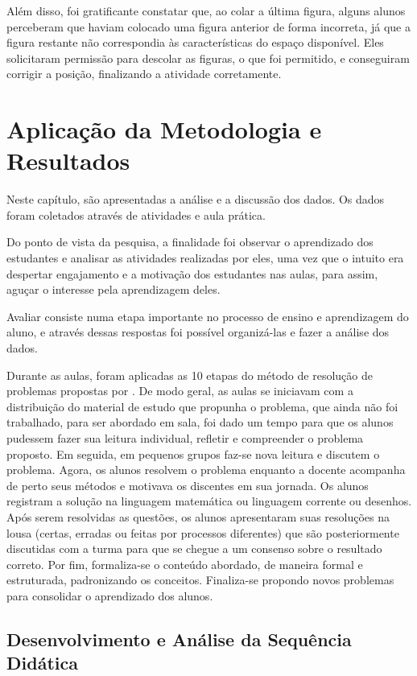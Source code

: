 Além disso, foi gratificante constatar que, ao colar a última figura, alguns alunos perceberam que haviam colocado uma figura anterior de forma incorreta, já que a figura restante não correspondia às características do espaço disponível. Eles solicitaram permissão para descolar as figuras, o que foi permitido, e conseguiram corrigir a posição, finalizando a atividade corretamente.

\chapter{Aplicação da Metodologia e Resultados} \label{cap:4_aplicacao}

Neste capítulo, são apresentadas a análise e a discussão dos dados. Os dados foram coletados através de atividades e aula prática.

Do ponto de vista da pesquisa, a finalidade foi observar o aprendizado dos estudantes e analisar as atividades realizadas por eles, uma vez que o intuito era despertar engajamento e a motivação dos estudantes nas aulas, para assim, aguçar o interesse pela aprendizagem deles.

Avaliar consiste numa etapa importante no processo de ensino e aprendizagem do aluno, e através dessas respostas foi possível organizá-las e fazer a análise dos dados.

Durante as aulas, foram aplicadas as 10 etapas do método de resolução de problemas propostas por . De modo geral, as aulas se iniciavam com a distribuição do material de estudo que propunha o problema, que ainda não foi trabalhado, para ser abordado em sala, foi dado um tempo para que os alunos pudessem fazer sua leitura individual, refletir e compreender o problema proposto. Em seguida, em pequenos grupos faz-se nova leitura e discutem o problema. Agora, os alunos resolvem o problema enquanto a docente acompanha de perto seus métodos e motivava os discentes em sua jornada. Os alunos registram a solução na linguagem matemática ou linguagem corrente ou desenhos. Após serem resolvidas as questões, os alunos apresentaram suas resoluções na lousa (certas, erradas ou feitas por processos diferentes) que são posteriormente discutidas com a turma para que se chegue a um consenso sobre o resultado correto. Por fim, formaliza-se o conteúdo abordado, de maneira formal e estruturada, padronizando os conceitos. Finaliza-se propondo novos problemas para consolidar o aprendizado dos alunos.

\section{Desenvolvimento e Análise da Sequência Didática}

